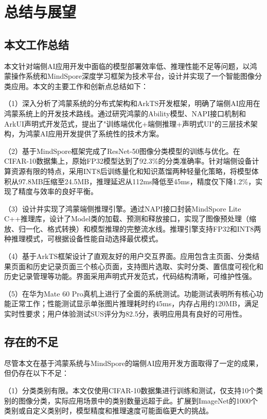 \chapter{总结与展望}

\section{本文工作总结}

本文针对端侧AI应用开发中面临的模型部署效率低、推理性能不足等问题，以鸿蒙操作系统和MindSpore深度学习框架为技术平台，设计并实现了一个智能图像分类应用。本文的主要工作和创新点总结如下：

（1）深入分析了鸿蒙系统的分布式架构和ArkTS开发框架，明确了端侧AI应用在鸿蒙系统上的开发技术路线。通过研究鸿蒙的Ability模型、NAPI接口机制和ArkUI声明式开发范式，提出了"训练端优化+端侧推理+声明式UI"的三层技术架构，为鸿蒙AI应用开发提供了系统性的技术方案。

（2）基于MindSpore框架完成了ResNet-50图像分类模型的训练与优化。在CIFAR-10数据集上，原始FP32模型达到了92.3\%的分类准确率。针对端侧设备计算资源有限的特点，采用INT8后训练量化和知识蒸馏两种轻量化策略，将模型体积从97.8MB压缩至24.5MB，推理延迟从112ms降低至45ms，精度仅下降1.2\%，实现了精度与效率的良好平衡。

（3）设计并实现了鸿蒙端侧推理引擎。通过NAPI接口封装MindSpore Lite C++推理库，设计了Model类的加载、预测和释放接口，实现了图像预处理（缩放、归一化、格式转换）和模型推理的完整流水线。推理引擎支持FP32和INT8两种推理模式，可根据设备性能自动选择最优模式。

（4）基于ArkTS框架设计了直观友好的用户交互界面。应用包含主页面、分类结果页面和历史记录页面三个核心页面，支持图片选取、实时分类、置信度可视化和历史记录管理等功能。界面采用声明式开发范式，代码结构清晰，可维护性强。

（5）在华为Mate 60 Pro真机上进行了全面的系统测试。功能测试表明所有核心功能正常工作；性能测试显示单张图片推理耗时约45ms，内存占用约120MB，满足实时性要求；用户体验测试SUS评分为82.5分，表明应用具有良好的可用性。

\section{存在的不足}

尽管本文在基于鸿蒙系统与MindSpore的端侧AI应用开发方面取得了一定的成果，但仍存在以下不足：

（1）分类类别有限。本文仅使用CIFAR-10数据集进行训练和测试，仅支持10个类别的图像分类，实际应用场景中的类别数量远超于此。扩展到ImageNet的1000个类别或自定义类别时，模型精度和推理速度可能面临更大的挑战。

